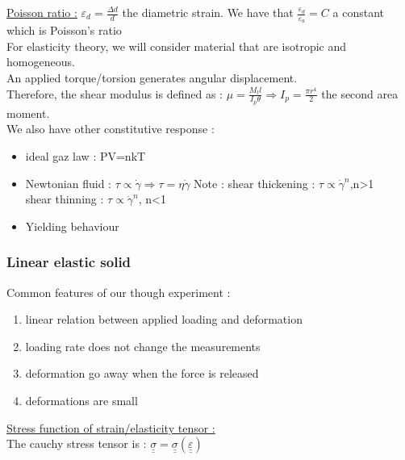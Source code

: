 \documentclass[../main.tex]{subfiles}
\begin{document}
\quad \underline{Poisson ratio :} $\varepsilon_d = \frac{\Delta d}{d}$ the diametric strain. We have that $\frac{\varepsilon_d}{\varepsilon_a} = C$ a constant which is Poisson's ratio\\

For elasticity theory, we will consider material that are isotropic and homogeneous.\\

An applied torque/torsion generates angular displacement.\\

Therefore, the shear modulus is defined as : $\mu = \frac{M_t l}{I_p \theta} \Rightarrow I_p =  \frac{\pi r^4}{2}$ the second area moment.\\

We also have other constitutive response : \begin{itemize}
    \item ideal gaz law : PV=nkT\\
    \item Newtonian fluid : $\tau \propto \dot{\gamma} \Rightarrow \tau = \eta \dot{\gamma}$ \color{gray}Note : shear thickening : $\tau \propto \dot{\gamma}^n$,n>1\\
    shear thinning : $\tau \propto \dot{\gamma}^n$, n<1\color{black}\\
    \item Yielding behaviour\\
\end{itemize}

\subsubsection{Linear elastic solid}
Common features of our though experiment : \begin{enumerate}
    \item linear relation between applied loading and deformation\\
    \item loading rate does not change the measurements\\
    \item deformation go away when the force is released\\
    \item deformations are small\\
\end{enumerate}

\quad \underline{Stress function of strain/elasticity tensor :}\\
The cauchy stress tensor is : $\underline{\underline{\sigma}} = \underline{\underline{\sigma}}(\underline{\underline{\varepsilon}})$\\
\end{document}
